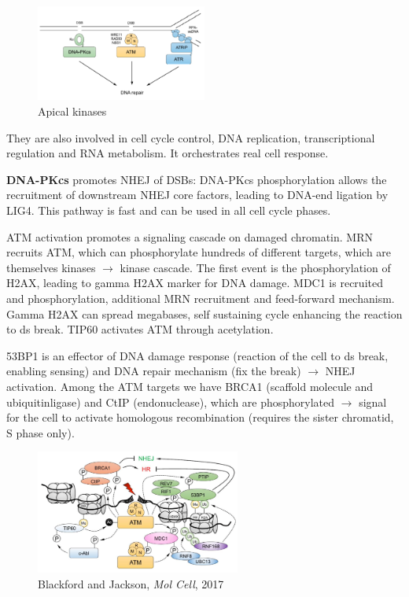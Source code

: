 \begin{figure}
\centering
\includegraphics[width=0.5\textwidth]{../_resources/Screen_Shot_2022-11-30_at_09-11-05.png}
\caption{Apical kinases}
\label{fig:apical}
\end{figure}

They are also involved in cell cycle control, DNA replication, transcriptional regulation and RNA metabolism. It orchestrates real cell response.

\textbf{DNA-PKcs} promotes NHEJ of DSBs: DNA-PKcs phosphorylation allows the recruitment of downstream NHEJ core factors, leading to DNA-end ligation by LIG4. This pathway is fast and can be used in all cell cycle phases.

ATM activation promotes a signaling cascade on damaged chromatin. MRN recruits ATM, which can phosphorylate hundreds of different targets, which are themselves kinases $\rightarrow$ kinase cascade. The first event is the phosphorylation of H2AX, leading to gamma H2AX marker for DNA damage. MDC1 is recruited and phosphorylation, additional MRN recruitment and feed-forward mechanism. Gamma H2AX can spread megabases, self sustaining cycle enhancing the reaction to ds break. TIP60 activates ATM through acetylation.

53BP1 is an effector of DNA damage response (reaction of the cell to ds break, enabling sensing) and DNA repair mechanism (fix the break) $\rightarrow$ NHEJ activation. Among the ATM targets we have BRCA1 (scaffold molecule and ubiquitinligase) and CtIP (endonuclease), which are phosphorylated $\rightarrow$ signal for the cell to activate homologous recombination (requires the sister chromatid, S phase only).

\begin{figure}
\centering
\includegraphics[width=0.6\textwidth]{../_resources/Screen_Shot_2022-11-30_at_09-16-55.png}
\caption{Blackford and Jackson, \emph{Mol Cell}, 2017}
\end{figure}

